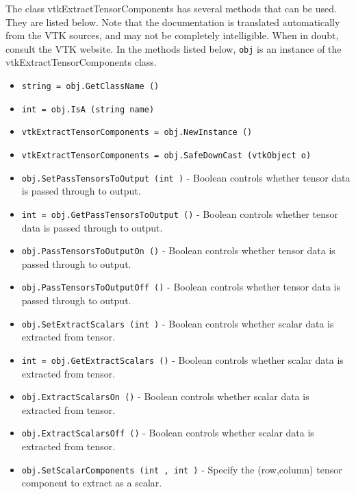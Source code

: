 The class vtkExtractTensorComponents has several methods that can be used.
  They are listed below.
Note that the documentation is translated automatically from the VTK sources,
and may not be completely intelligible.  When in doubt, consult the VTK website.
In the methods listed below, \verb|obj| is an instance of the vtkExtractTensorComponents class.
\begin{itemize}
\item  \verb|string = obj.GetClassName ()|

\item  \verb|int = obj.IsA (string name)|

\item  \verb|vtkExtractTensorComponents = obj.NewInstance ()|

\item  \verb|vtkExtractTensorComponents = obj.SafeDownCast (vtkObject o)|

\item  \verb|obj.SetPassTensorsToOutput (int )| -  Boolean controls whether tensor data is passed through to output.

\item  \verb|int = obj.GetPassTensorsToOutput ()| -  Boolean controls whether tensor data is passed through to output.

\item  \verb|obj.PassTensorsToOutputOn ()| -  Boolean controls whether tensor data is passed through to output.

\item  \verb|obj.PassTensorsToOutputOff ()| -  Boolean controls whether tensor data is passed through to output.

\item  \verb|obj.SetExtractScalars (int )| -  Boolean controls whether scalar data is extracted from tensor.

\item  \verb|int = obj.GetExtractScalars ()| -  Boolean controls whether scalar data is extracted from tensor.

\item  \verb|obj.ExtractScalarsOn ()| -  Boolean controls whether scalar data is extracted from tensor.

\item  \verb|obj.ExtractScalarsOff ()| -  Boolean controls whether scalar data is extracted from tensor.

\item  \verb|obj.SetScalarComponents (int , int )| -  Specify the (row,column) tensor component to extract as a scalar.


\end{itemize}
